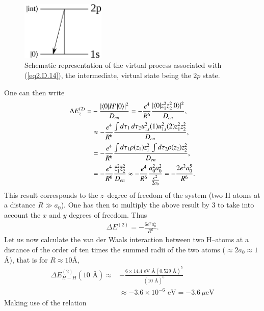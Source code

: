 \begin{subappendices}
        \begin{figure}[h]
         \centerline{\includegraphics*[width=4cm,angle=0]{nutshell/figs/fig2D5_v2.pdf}}
         \caption[Schematic representation of the virtual process associated with (\ref{eq2.D.14}), the intermediate, virtual state being the $2p$ state.]{Schematic representation of the virtual process associated with (\ref{eq2.D.14}), the intermediate, virtual state being the $2p$ state.}\label{fig2.D.5}
         \end{figure}
  One can then write
  \begin{align}\label{eq2.D.17}
  \nonumber \Delta E_z^{(2)}=&-\frac{|\langle {0|H'|0} \rangle|^2}{D_{en}}=-\frac{e^4}{R^6}\frac{|\langle {0|z_1^2z_2^2|0} \rangle|^2}{D_{en}},\\
\nonumber  &\approx-\frac{e^4}{R^6}\frac{\int d\tau_1\,d\tau_2u^2_{1s}(1)u^2_{1s}(2)z_1^2z_2^2}{D_{en}},\\
\nonumber  &=-\frac{e^4}{R^6}\frac{\int d\tau_1\rho(z_1)z_1^2\,\int d\tau_2\rho(z_2)z_2^2}{D_{en}},\\
&=-\frac{e^4}{R^6}\frac{\bar z_1^2 \bar z_2^2}{D_{en}}\approx-\frac{e^4}{R^6}\frac{a_0^2a_0^2}{\frac{e^2}{2a_0}}=-\frac{2e^2a_0^5}{R^6}.  
   \end{align} 
This result corresponds to the $z$--degree of freedom of the system (two H atoms at a distance $R\gg a_0$). One has then to multiply the above result by 3 to take into account the $x$ and $y$ degrees of freedom. Thus   
   \begin{align}\label{eq2.D.18}
\Delta E^{(2)}=-\frac{6e^2a_0^5}{R^6}.
 \end{align}
Let us now calculate the van der Waals interaction between two H--atoms at a distance of the order of ten times the summed radii of the two atoms ($\approx2a_0\approx1$\AA), that is for $R\approx10$\AA, 
  \begin{align}\label{eq2.D.19}
  \nonumber \Delta E_{H-H}^{(2)}(10\text{ \AA})\approx&-\frac{6\times14.4\text{ eV \AA}(0.529\text{ \AA})^5}{(10\text{ \AA})^6}\\
  &\approx-3.6\times10^{-6}\text{ eV}=-3.6\,\mu\text{eV}  
   \end{align}  
Making use of the relation
\begin{align}\label{eq2.D.20}

\end{align}
\end{subappendices}
